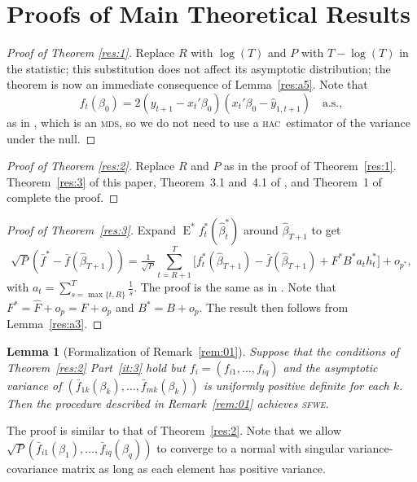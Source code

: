 \documentclass[12pt,fleqn]{article}
\newtheorem{lem}[thm]{Lemma}
\theoremstyle{definition}
\DeclareMathOperator{\E}{E}
\newcommand{\hac}{\textsc{hac}}
\newcommand{\mds}{\textsc{mds}}
\newcommand{\sfwe}{\textsc{sfwe}}
\begin{document}
\section{Proofs of Main Theoretical Results}\label{sec:B}

\begin{proof}[Proof of Theorem \ref{res:1}]
  Replace $R$ with $\log(T)$ and $P$ with $T - \log(T)$ in the
  statistic; this substitution does not affect its asymptotic
  distribution; the theorem is now an immediate consequence of
  Lemma~\ref{res:a5}.  Note that \[f_t(\beta_0)= 2 (y_{t+1} -
  x_t'\beta_0)(x_t'\beta_0 - \hat{y}_{1,t+1}) \quad \text{a.s.},\] as
  in \citet{ClW:07}, which is an \mds, so we do not need to use a
  \hac\ estimator of the variance under the null.
\end{proof}

\begin{proof}[Proof of Theorem \ref{res:2}]
  Replace $R$ and $P$ as in the proof of Theorem~\ref{res:1}.
  Theorem~\ref{res:3} of this paper, Theorem~3.1 and~4.1 of
  \citet{RoW:05}, and Theorem~1 of \citet{Cal:11e} complete the proof.
\end{proof}

\begin{proof}[Proof of Theorem~\ref{res:3}] Expand $\E^{*}
  f_t^{*}(\hat{\beta}_t^{*})$ around $\hat{\beta}_{T+1}$ to get
  \begin{equation}
    \sqrt{P} (\bar{f}^{*} - \bar{f}(\hat{\beta}_{T+1})) =
    \tfrac{1}{\sqrt{P}} \sum_{t=R+1}^T
    \big[f_t^{*}(\hat{\beta}_{T+1}) - \bar{f}(\hat{\beta}_{T+1}) +
    F^{*} B^{*} a_t h_t^{*} \big] + o_{p^{*}},
  \end{equation}
  with $a_t = \sum_{s=\max\{t,R\}}^T \tfrac1s$.  The proof is the same as
  in \citet[Theorem 2.3.1]{Mcc:00}.  Note that $F^{*} = \hat{F} +
  o_{p} = F + o_p$ and $B^{*} = B + o_{p}$.  The result then follows
  from Lemma~\ref{res:a3}.
\end{proof}

\begin{lem}[Formalization of Remark~\ref{rem:01}]
  Suppose that the conditions of Theorem~\ref{res:2} Part~\ref{it:3}
  hold but $f_i = (f_{i1},\dots,f_{iq})$ and the asymptotic variance
  of $(\bar{f}_{1k}(\beta_k),\dots,\bar{f}_{mk}(\beta_k))$ is
  uniformly positive definite for each $k$.  Then the procedure
  described in Remark~\ref{rem:01} achieves \sfwe.
\end{lem}

The proof is similar to that of Theorem~\ref{res:2}. Note that we
allow $\sqrt{P}(\bar{f}_{i1}(\beta_1),\dots,\bar{f}_{iq}(\beta_q))$ to
converge to a normal with singular variance-covariance matrix as long
as each element has positive variance.


\end{document}
